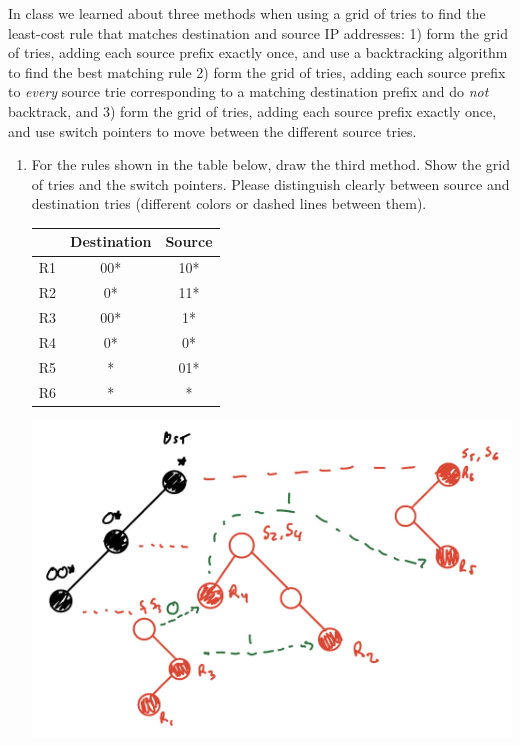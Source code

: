 \documentclass[10pt]{article}
\newenvironment{problem}[2][]{\begin{trivlist}
\item[\hskip \labelsep {\bfseries #1}\hskip \labelsep {\bfseries #2.}]}{\end{trivlist}}
\begin{document}
\begin{problem}{8: Grid of Tries}
In class we learned about three methods when using a grid of tries to find the least-cost rule that matches destination and source IP addresses: 1) form the grid of tries, adding each source prefix exactly once, and use a backtracking algorithm to find the best matching rule 2) form the grid of tries, adding each source prefix to \emph{every} source trie corresponding to a matching destination prefix and do \emph{not} backtrack, and 3) form the grid of tries, adding each source prefix exactly once, and use switch pointers to move between the different source tries.

\begin{enumerate}[label=(\alph*)]
    \item For the rules shown in the table below, draw the third method. Show the grid of tries and the switch pointers. Please distinguish clearly between source and destination tries (different colors or dashed lines between them).
    \begin{table}[ht]
    \begin{center}
    \begin{tabular}{|c|c|c|}
    	\hline
    	 & Destination & Source\\
    	\hline
    	R1 & 00* & 10* \\
    	\hline
    	R2 & 0* & 11*\\
    	\hline
    	R3 & 00* & 1*\\
    	\hline
    	R4 & 0* & 0*\\
    	\hline
    	R5 & * & 01*\\
    	\hline
    	R6 & * & *\\
    	\hline
    	
    \end{tabular}
    \end{center}
    \end{table}
\begin{center}
    \includegraphics[scale = 0.35]{IMG_8C8A29BBB830-1.jpeg}
\end{center}


\end{enumerate}
\end{problem}
\end{document}
